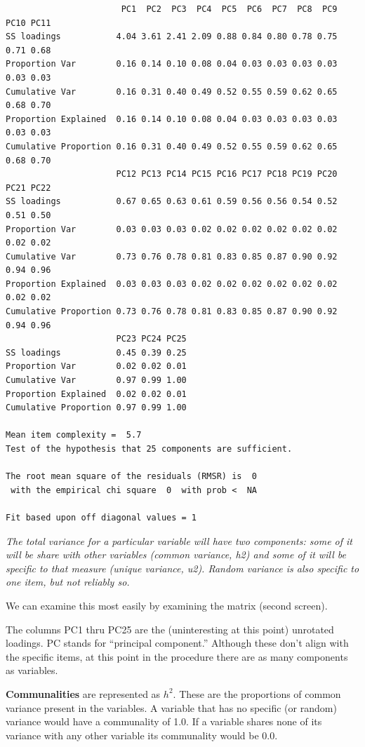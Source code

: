 \documentclass[
  english,
]{book}
\begin{document}
\begin{verbatim}
                       PC1  PC2  PC3  PC4  PC5  PC6  PC7  PC8  PC9 PC10 PC11
SS loadings           4.04 3.61 2.41 2.09 0.88 0.84 0.80 0.78 0.75 0.71 0.68
Proportion Var        0.16 0.14 0.10 0.08 0.04 0.03 0.03 0.03 0.03 0.03 0.03
Cumulative Var        0.16 0.31 0.40 0.49 0.52 0.55 0.59 0.62 0.65 0.68 0.70
Proportion Explained  0.16 0.14 0.10 0.08 0.04 0.03 0.03 0.03 0.03 0.03 0.03
Cumulative Proportion 0.16 0.31 0.40 0.49 0.52 0.55 0.59 0.62 0.65 0.68 0.70
                      PC12 PC13 PC14 PC15 PC16 PC17 PC18 PC19 PC20 PC21 PC22
SS loadings           0.67 0.65 0.63 0.61 0.59 0.56 0.56 0.54 0.52 0.51 0.50
Proportion Var        0.03 0.03 0.03 0.02 0.02 0.02 0.02 0.02 0.02 0.02 0.02
Cumulative Var        0.73 0.76 0.78 0.81 0.83 0.85 0.87 0.90 0.92 0.94 0.96
Proportion Explained  0.03 0.03 0.03 0.02 0.02 0.02 0.02 0.02 0.02 0.02 0.02
Cumulative Proportion 0.73 0.76 0.78 0.81 0.83 0.85 0.87 0.90 0.92 0.94 0.96
                      PC23 PC24 PC25
SS loadings           0.45 0.39 0.25
Proportion Var        0.02 0.02 0.01
Cumulative Var        0.97 0.99 1.00
Proportion Explained  0.02 0.02 0.01
Cumulative Proportion 0.97 0.99 1.00

Mean item complexity =  5.7
Test of the hypothesis that 25 components are sufficient.

The root mean square of the residuals (RMSR) is  0 
 with the empirical chi square  0  with prob <  NA 

Fit based upon off diagonal values = 1
\end{verbatim}

\emph{The total variance for a particular variable will have two components: some of it will be share with other variables (common variance, h2) and some of it will be specific to that measure (unique variance, u2). Random variance is also specific to one item, but not reliably so.}

We can examine this most easily by examining the matrix (second screen).

The columns PC1 thru PC25 are the (uninteresting at this point) unrotated loadings. PC stands for ``principal component.'' Although these don't align with the specific items, at this point in the procedure there are as many components as variables.

\textbf{Communalities} are represented as \(h^2\). These are the proportions of common variance present in the variables. A variable that has no specific (or random) variance would have a communality of 1.0. If a variable shares none of its variance with any other variable its communality would be 0.0.
\end{document}
